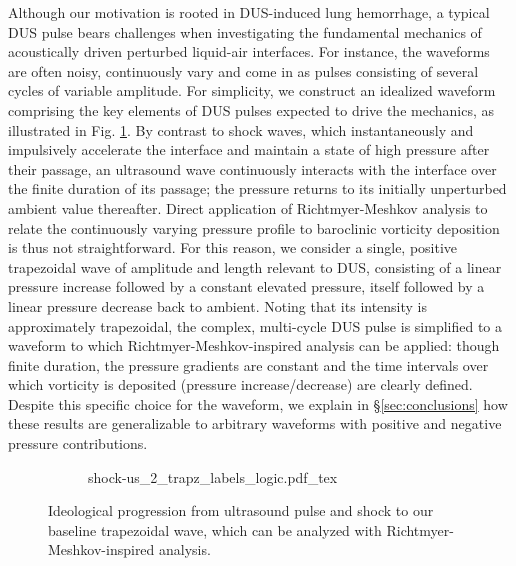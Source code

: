 \documentclass{jfm}%
\begin{document}
Although our motivation is rooted in \ac{DUS}-induced lung hemorrhage,
a typical \ac{DUS} pulse bears challenges when investigating the
fundamental mechanics of acoustically driven perturbed liquid-air
interfaces. For instance, the waveforms are often noisy, continuously
vary and come in as pulses consisting of several cycles of variable
amplitude.  For simplicity, we construct an idealized waveform
comprising the key elements of \ac{DUS} pulses expected to drive the
mechanics, as illustrated in Fig. \ref{fig:p0}.  By contrast to
shock waves, which instantaneously and impulsively accelerate the
interface and maintain a state of high pressure after their passage,
an ultrasound wave continuously interacts with the interface over the
finite duration of its passage; the pressure returns to its initially
unperturbed ambient value thereafter. Direct application of
Richtmyer-Meshkov analysis to relate the continuously varying pressure
profile to baroclinic vorticity deposition is thus not
straightforward. For this reason, we consider a single, positive
trapezoidal wave of amplitude and length relevant to \ac{DUS},
consisting of a linear pressure increase followed by a constant
elevated pressure, itself followed by a linear pressure decrease back
to ambient. Noting that its intensity is approximately trapezoidal,
the complex, multi-cycle \ac{DUS} pulse is simplified to a waveform to
which Richtmyer-Meshkov-inspired analysis can be applied: though finite
duration, the pressure gradients are constant and the time intervals
over which vorticity is deposited (pressure increase/decrease) are
clearly defined. Despite this specific choice for the waveform, we
explain in \S \ref{sec:conclusions} how these results are
generalizable to arbitrary waveforms with positive and negative
pressure contributions.

\begin{figure}%
  \centering%
  \begin{subfigure}[b]{\textwidth}
    \centering
    \def\svgwidth{\textwidth}%
    {shock-us_2_trapz_labels_logic.pdf_tex}%
  \end{subfigure}
  \caption[Trapezoidal wave]{Ideological progression from ultrasound
    pulse and shock to our baseline trapezoidal wave, which can be analyzed with
    Richtmyer-Meshkov-inspired analysis.}%
  \label{fig:p0}
\end{figure}
\end{document}

